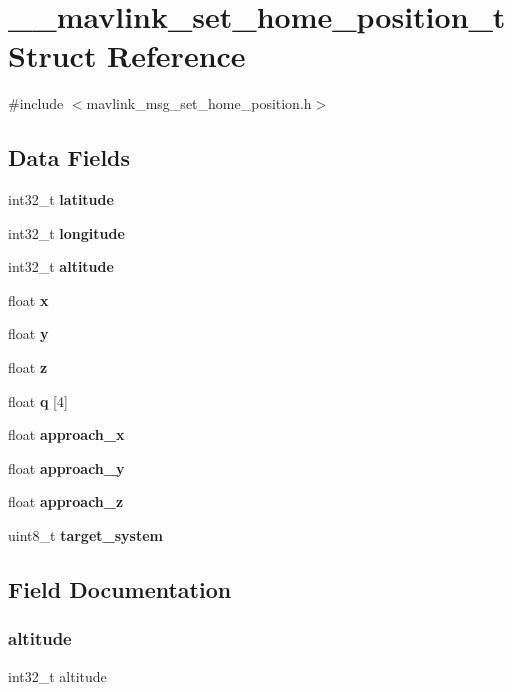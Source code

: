 \section{\+\_\+\+\_\+mavlink\+\_\+set\+\_\+home\+\_\+position\+\_\+t Struct Reference}
\label{struct____mavlink__set__home__position__t}


{\ttfamily \#include $<$mavlink\+\_\+msg\+\_\+set\+\_\+home\+\_\+position.\+h$>$}

\subsection*{Data Fields}
\begin{DoxyCompactItemize}
\item 
int32\+\_\+t \textbf{ latitude}
\item 
int32\+\_\+t \textbf{ longitude}
\item 
int32\+\_\+t \textbf{ altitude}
\item 
float \textbf{ x}
\item 
float \textbf{ y}
\item 
float \textbf{ z}
\item 
float \textbf{ q} [4]
\item 
float \textbf{ approach\+\_\+x}
\item 
float \textbf{ approach\+\_\+y}
\item 
float \textbf{ approach\+\_\+z}
\item 
uint8\+\_\+t \textbf{ target\+\_\+system}
\end{DoxyCompactItemize}


\subsection{Field Documentation}
\mbox{\label{struct____mavlink__set__home__position__t_a5402881d7f8a92e6838995507bf2e7f9}} 
\subsubsection{altitude}
{\footnotesize\ttfamily int32\+\_\+t altitude}

